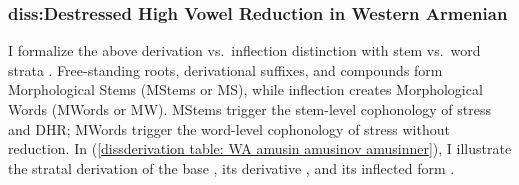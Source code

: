		
	




			
			
			
		

\subsubsection{diss:Destressed High Vowel Reduction  in Western Armenian}\label{disssection: reduction: destressed high reduction WA}










I formalize the above derivation vs.\ inflection distinction   with   stem vs.\ word strata \citep{Kiparsky-1982-lexicalMorphoPhono,Kiparsky-2000-OpacityCyclicity,Kiparsky-2015-StratalOT,Bermudez-2011-Cyclicity,Bermudez-2012-ArchitectureDivisionLaborExponence,BermudezOtero-2018-StratalPhonology}.  Free-standing roots, derivational suffixes, and compounds form    Morphological Stems (MStems or MS), while inflection creates Morphological Words (MWords or MW). MStems trigger the stem-level cophonology of stress and DHR; MWords trigger the word-level cophonology of stress without reduction. 
In (\ref{dissderivation table: WA amusin amusinov amusinner}), I illustrate the stratal derivation  of the base \textit{}, its derivative \textit{}, and its inflected form \textit{}. 



